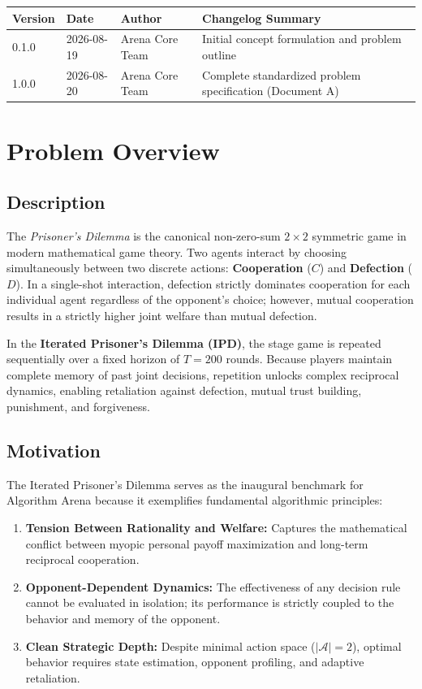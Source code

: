 ﻿\documentclass[11pt,a4paper]{article}
\begin{document}
\begin{center}
\begin{tabularx}{\textwidth}{llXX}
\toprule
\textbf{Version} & \textbf{Date} & \textbf{Author} & \textbf{Changelog Summary} \\
\midrule
0.1.0 & 2026-08-19 & Arena Core Team & Initial concept formulation and problem outline \\
1.0.0 & 2026-08-20 & Arena Core Team & Complete standardized problem specification (Document A) \\
\bottomrule
\end{tabularx}
\end{center}


\section{Problem Overview}

\subsection{Description}
The \textit{Prisoner's Dilemma} is the canonical non-zero-sum $2 \times 2$ symmetric game in modern mathematical game theory. Two agents interact by choosing simultaneously between two discrete actions: \textbf{Cooperation} ($C$) and \textbf{Defection} ($D$). In a single-shot interaction, defection strictly dominates cooperation for each individual agent regardless of the opponent's choice; however, mutual cooperation results in a strictly higher joint welfare than mutual defection.

In the \textbf{Iterated Prisoner's Dilemma (IPD)}, the stage game is repeated sequentially over a fixed horizon of $T = 200$ rounds. Because players maintain complete memory of past joint decisions, repetition unlocks complex reciprocal dynamics, enabling retaliation against defection, mutual trust building, punishment, and forgiveness.

\subsection{Motivation}
The Iterated Prisoner's Dilemma serves as the inaugural benchmark for Algorithm Arena because it exemplifies fundamental algorithmic principles:
\begin{enumerate}
    \item \textbf{Tension Between Rationality and Welfare:} Captures the mathematical conflict between myopic personal payoff maximization and long-term reciprocal cooperation.
    \item \textbf{Opponent-Dependent Dynamics:} The effectiveness of any decision rule cannot be evaluated in isolation; its performance is strictly coupled to the behavior and memory of the opponent.
    \item \textbf{Clean Strategic Depth:} Despite minimal action space ($|\mathcal{A}| = 2$), optimal behavior requires state estimation, opponent profiling, and adaptive retaliation.
\end{enumerate}
\end{document}
